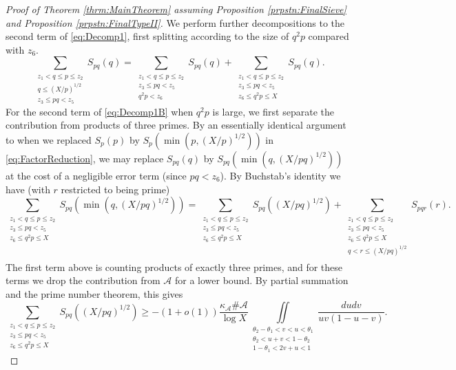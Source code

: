 \documentclass[10pt]{amsart}
\theoremstyle{plain}
\numberwithin{sblmm}{thrm}
\numberwithin{equation}{section}
\begin{document}
\begin{proof}[Proof of Theorem \ref{thrm:MainTheorem} assuming Proposition \ref{prpstn:FinalSieve} and Proposition \ref{prpstn:FinalTypeII}]
We perform further decompositions to the second term of \eqref{eq:Decomp1}, first splitting according to the size of $q^2 p$ compared with $z_6$.
%
\begin{equation}
\sum_{\substack{z_1<q\le p\le z_2\\ q\le (X/p)^{1/2}\\ z_3\le p q<z_5}}S_{p q}(q)
=\sum_{\substack{z_1<q\le p\le z_2\\ z_3\le p q<z_5\\ q^2 p < z_6}}S_{p q}(q)
+\sum_{\substack{z_1<q\le p\le z_2\\ z_3\le p q<z_5\\ z_6\le q^2 p\le X}}S_{p q}(q).
\label{eq:Decomp1B}
\end{equation}
%
For the second term of \eqref{eq:Decomp1B} when $q^2p$ is large, we first separate the contribution from products of three primes. By an essentially identical argument to when we replaced $S_p(p)$ by $S_p(\min(p,(X/p)^{1/2}))$ in \eqref{eq:FactorReduction}, we may replace $S_{p q}(q)$ by $S_{p q}(\min(q,(X/p q)^{1/2}))$ at the cost of a negligible error term (since $p q<z_6$). By Buchstab's identity we have (with $r$ restricted to being prime)
\[
\sum_{\substack{z_1<q\le p\le z_2\\ z_3\le p q<z_5\\ z_6\le q^2 p\le X}}S_{p q}(\min(q,(X/p q)^{1/2}))=\sum_{\substack{z_1<q\le p\le z_2\\ z_3\le p q<z_5\\ z_6\le q^2 p\le X}}S_{p q}((X/p q)^{1/2})+\sum_{\substack{z_1<q\le p\le z_2\\  z_3\le p q<z_5\\ z_6\le q^2 p\le X\\ q<r\le (X/p q)^{1/2} \\}}S_{p q r}(r).
\]
%
%
The first term above is counting products of exactly three primes, and for these terms we drop the contribution from $\mathcal{A}{}$ for a lower bound. By partial summation and the prime number theorem, this gives
%
\begin{equation}
\sum_{\substack{z_1<q\le p\le z_2\\ z_3\le p q<z_5\\ z_6\le q^2 p\le X}}S_{p q}((X/p q)^{1/2})
\ge-(1+o(1))\frac{\kappa_{\mathcal{A}}\#\mathcal{A}{}}{\log{X}}
\iint\limits_{\substack{\theta_2-\theta_1<v<u<\theta_1\\ \theta_2<u+v<1-\theta_2\\ 1-\theta_1<2v+u<1}}
\frac{d u d v}{u v(1-u-v)}.
\label{eq:I2}

\end{equation}
\end{proof}
\end{document}
